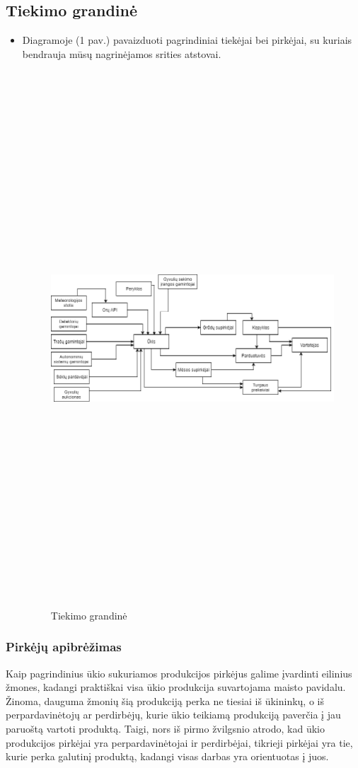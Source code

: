 \documentclass[oneside]{VUMIFPSkursinis}
\begin{document}
	\subsection{Tiekimo grandinė}
	\begin{itemize}
\item Diagramoje (1 pav.) pavaizduoti pagrindiniai tiekėjai bei pirkėjai, su kuriais bendrauja mūsų nagrinėjamos srities atstovai.
		\begin{figure}[H]
		\centering	
	\includegraphics[width=18cm,height=20cm,keepaspectratio]{supplyChain.png}
	\caption{Tiekimo grandinė}
	\label{fig:supplyChain}
\end{figure}
\end{itemize}
\subsubsection{Pirkėjų apibrėžimas}
Kaip pagrindinius ūkio sukuriamos produkcijos pirkėjus galime įvardinti eilinius žmones, kadangi praktiškai visa ūkio produkcija suvartojama maisto pavidalu. Žinoma, dauguma žmonių šią produkciją perka ne tiesiai iš ūkininkų, o iš perpardavinėtojų ar perdirbėjų, kurie ūkio teikiamą produkciją paverčia į jau paruoštą vartoti produktą. Taigi, nors iš pirmo žvilgsnio atrodo, kad ūkio produkcijos pirkėjai yra perpardavinėtojai ir perdirbėjai, tikrieji pirkėjai yra tie, kurie perka galutinį produktą, kadangi visas darbas yra orientuotas į juos.
\end{document}
